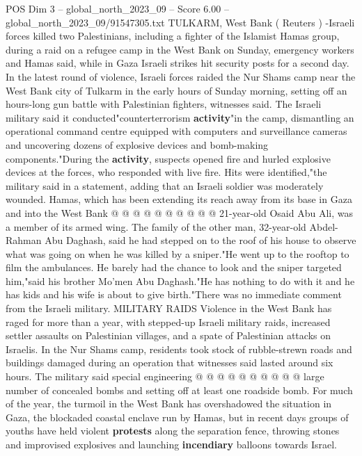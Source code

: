 \begin{textsample}{POS Dim 3 – global\_north\_2023\_09 – Score 6.00 – global\_north\_2023\_09/91547305.txt}  \label{ex:f3_pos_066}
TULKARM, West Bank ( Reuters ) -Israeli forces killed two Palestinians, including a fighter of the Islamist Hamas group, during a raid on a refugee camp in the West Bank on Sunday, emergency workers and Hamas said, while in Gaza Israeli strikes hit security posts for a second day.
In the latest round of violence, Israeli forces raided the Nur Shams camp near the West Bank city of Tulkarm in the early hours of Sunday morning, setting off an hours-long gun battle with Palestinian fighters, witnesses said.
The Israeli military said it conducted"counterterrorism \textbf{activity}"in the camp, dismantling an operational command centre equipped with computers and surveillance cameras and uncovering dozens of explosive devices and bomb-making components."During the \textbf{activity}, suspects opened fire and hurled explosive devices at the forces, who responded with live fire.
Hits were identified,"the military said in a statement, adding that an Israeli soldier was moderately wounded.
Hamas, which has been extending its reach away from its base in Gaza and into the West Bank @ @ @ @ @ @ @ @ @ @ 21-year-old Osaid Abu Ali, was a member of its armed wing.
The family of the other man, 32-year-old Abdel-Rahman Abu Daghash, said he had stepped on to the roof of his house to observe what was going on when he was killed by a sniper."He went up to the rooftop to film the ambulances.
He barely had the chance to look and the sniper targeted him,"said his brother Mo'men Abu Daghash."He has nothing to do with it and he has kids and his wife is about to give birth."There was no immediate comment from the Israeli military.
MILITARY RAIDS Violence in the West Bank has raged for more than a year, with stepped-up Israeli military raids, increased settler assaults on Palestinian villages, and a spate of Palestinian attacks on Israelis.
In the Nur Shams camp, residents took stock of rubble-strewn roads and buildings damaged during an operation that witnesses said lasted around six hours.
The military said special engineering @ @ @ @ @ @ @ @ @ @ large number of concealed bombs and setting off at least one roadside bomb.
For much of the year, the turmoil in the West Bank has overshadowed the situation in Gaza, the blockaded coastal enclave run by Hamas, but in recent days groups of youths have held violent \textbf{protests} along the separation fence, throwing stones and improvised explosives and launching \textbf{incendiary} balloons towards Israel.

\end{textsample}

